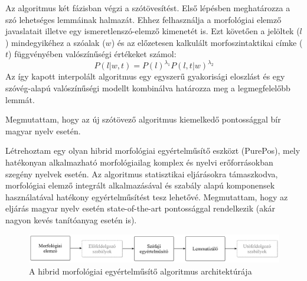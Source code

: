 Az algoritmus két fázisban végzi a szótövesítést. 
Első lépésben meghatározza a szó lehetséges lemmáinak halmazát. Ehhez felhasználja a morfológiai elemző javaslatait illetve egy ismeretlenszó-elemző kimenetét is. 
Ezt követően a jelöltek ($l$) mindegyikéhez a szóalak ($w$) és az előzetesen kalkulált morfoszintaktikai címke ($t$) függvényében valószínűségi értékeket számol:
\begin{equation}\label{lemma-interpolated}
P(l|w,t) = P(l)^{\lambda_1} P(l,t|w)^{\lambda_2}
\end{equation}
Az így kapott interpolált algoritmus egy egyszerű gyakorisági eloszlást és egy szóvég-alapú valószínűségi modellt kombinálva határozza meg a legmegfelelőbb lemmát.

Megmutattam, hogy az új szótövező algoritmus kiemelkedő pontossággal bír magyar nyelv esetén. %


\thesisline%


\begin{core}
\begin{thesis}\label{thes:morf-tagging}
Létrehoztam egy olyan hibrid morfológiai egyértelműsítő eszközt (PurePos), mely hatékonyan alkalmazható  morfológiailag komplex és nyelvi erőforrásokban szegény nyelvek esetén. 
Az algoritmus statisztikai eljárásokra támaszkodva, morfológiai elemző integrált alkalmazásával és szabály alapú komponensek használatával hatékony egyértelműsítést tesz lehetővé. 
Megmutattam, hogy az eljárás magyar nyelv esetén state-of-the-art pontossággal rendelkezik (akár nagyon kevés tanítóanyag esetén is).
\end{thesis}

\begin{pub}
\cite{Orosz2011,Orosz2012,Orosz2012a,Orosz2013a}
\end{pub}
\end{core}

\begin{figure}[ht] 
  \centering
  \includegraphics[width=1\textwidth]{MorphTagging/architecture_hu.png} 
  \caption{A hibrid morfológiai egyértelműsítő algoritmus architektúrája}
  \label{fig:purepos-arch_hu}
\end{figure}

